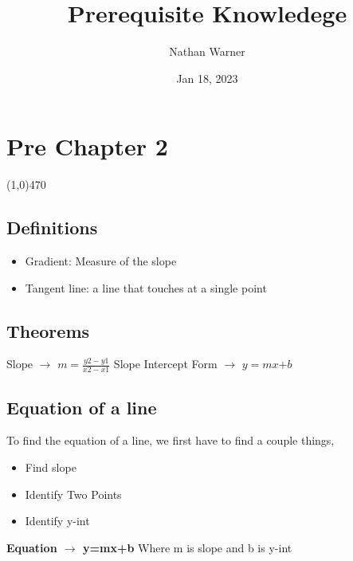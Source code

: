 \documentclass{report}
\title{\Huge{Prerequisite Knowledege}}
\author{\huge{Nathan Warner}}
\date{\huge{Jan 18, 2023}}
\begin{document}
    \maketitle
    \section{\Large{Pre Chapter 2}}
    \line(1,0){470}

    \bigbreak \noindent 
    \subsection{\large{Definitions}}
    \begin{large}
        \begin{itemize}
            \item Gradient: Measure of the slope 
            \item Tangent line: a line that touches at a single point
        \end{itemize}
    \end{large}

    \bigbreak \noindent 
    \subsection{\large{Theorems}}
    \begin{large}
        Slope $\rightarrow$ $m=\frac{y2-y1}{x2-x1}$ 
        \bigbreak \noindent 
        Slope Intercept Form $\rightarrow$ $y=mx$+$b$
    \end{large}
    

    \bigbreak \noindent 
    \subsection{\large{Equation of a line}}
    \begin{large}
       To find the equation of a line, we first have to find a couple things,
       \begin{itemize}
            \item Find slope
            \item Identify Two Points
            \item Identify y-int
       \end{itemize}

       \begin{center}
           \textbf{Equation $\rightarrow$ y=mx+b}       
           \bigbreak \noindent 
           Where m is slope and b is y-int
       \end{center}
    \end{large}
    
    
\end{document}
